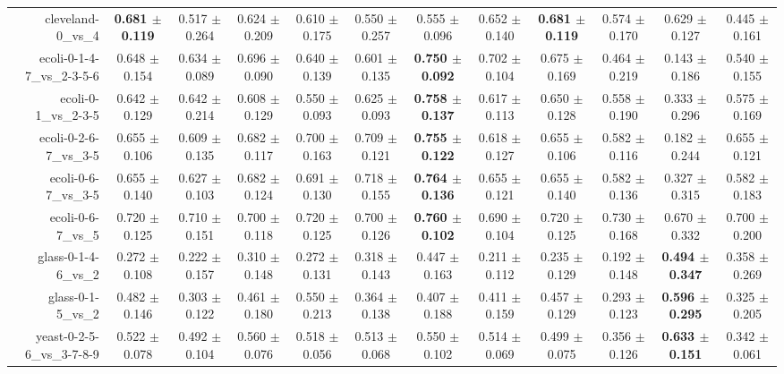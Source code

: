 \begin{table}[!ht]
{\begin{tabular}{r c c c c c c c c c c c}
cleveland-0\_vs\_4 & \textbf{0.681 $\pm$ 0.119} & 0.517 $\pm$ 0.264 & 0.624 $\pm$ 0.209 & 0.610 $\pm$ 0.175 & 0.550 $\pm$ 0.257 & 0.555 $\pm$ 0.096 & 0.652 $\pm$ 0.140 & \textbf{0.681 $\pm$ 0.119} & 0.574 $\pm$ 0.170 & 0.629 $\pm$ 0.127 & 0.445 $\pm$ 0.161 \\
ecoli-0-1-4-7\_vs\_2-3-5-6 & 0.648 $\pm$ 0.154 & 0.634 $\pm$ 0.089 & 0.696 $\pm$ 0.090 & 0.640 $\pm$ 0.139 & 0.601 $\pm$ 0.135 & \textbf{0.750 $\pm$ 0.092} & 0.702 $\pm$ 0.104 & 0.675 $\pm$ 0.169 & 0.464 $\pm$ 0.219 & 0.143 $\pm$ 0.186 & 0.540 $\pm$ 0.155 \\
ecoli-0-1\_vs\_2-3-5 & 0.642 $\pm$ 0.129 & 0.642 $\pm$ 0.214 & 0.608 $\pm$ 0.129 & 0.550 $\pm$ 0.093 & 0.625 $\pm$ 0.093 & \textbf{0.758 $\pm$ 0.137} & 0.617 $\pm$ 0.113 & 0.650 $\pm$ 0.128 & 0.558 $\pm$ 0.190 & 0.333 $\pm$ 0.296 & 0.575 $\pm$ 0.169 \\
ecoli-0-2-6-7\_vs\_3-5 & 0.655 $\pm$ 0.106 & 0.609 $\pm$ 0.135 & 0.682 $\pm$ 0.117 & 0.700 $\pm$ 0.163 & 0.709 $\pm$ 0.121 & \textbf{0.755 $\pm$ 0.122} & 0.618 $\pm$ 0.127 & 0.655 $\pm$ 0.106 & 0.582 $\pm$ 0.116 & 0.182 $\pm$ 0.244 & 0.655 $\pm$ 0.121 \\
ecoli-0-6-7\_vs\_3-5 & 0.655 $\pm$ 0.140 & 0.627 $\pm$ 0.103 & 0.682 $\pm$ 0.124 & 0.691 $\pm$ 0.130 & 0.718 $\pm$ 0.155 & \textbf{0.764 $\pm$ 0.136} & 0.655 $\pm$ 0.121 & 0.655 $\pm$ 0.140 & 0.582 $\pm$ 0.136 & 0.327 $\pm$ 0.315 & 0.582 $\pm$ 0.183 \\
ecoli-0-6-7\_vs\_5 & 0.720 $\pm$ 0.125 & 0.710 $\pm$ 0.151 & 0.700 $\pm$ 0.118 & 0.720 $\pm$ 0.125 & 0.700 $\pm$ 0.126 & \textbf{0.760 $\pm$ 0.102} & 0.690 $\pm$ 0.104 & 0.720 $\pm$ 0.125 & 0.730 $\pm$ 0.168 & 0.670 $\pm$ 0.332 & 0.700 $\pm$ 0.200 \\
glass-0-1-4-6\_vs\_2 & 0.272 $\pm$ 0.108 & 0.222 $\pm$ 0.157 & 0.310 $\pm$ 0.148 & 0.272 $\pm$ 0.131 & 0.318 $\pm$ 0.143 & 0.447 $\pm$ 0.163 & 0.211 $\pm$ 0.112 & 0.235 $\pm$ 0.129 & 0.192 $\pm$ 0.148 & \textbf{0.494 $\pm$ 0.347} & 0.358 $\pm$ 0.269 \\
glass-0-1-5\_vs\_2 & 0.482 $\pm$ 0.146 & 0.303 $\pm$ 0.122 & 0.461 $\pm$ 0.180 & 0.550 $\pm$ 0.213 & 0.364 $\pm$ 0.138 & 0.407 $\pm$ 0.188 & 0.411 $\pm$ 0.159 & 0.457 $\pm$ 0.129 & 0.293 $\pm$ 0.123 & \textbf{0.596 $\pm$ 0.295} & 0.325 $\pm$ 0.205 \\
yeast-0-2-5-6\_vs\_3-7-8-9 & 0.522 $\pm$ 0.078 & 0.492 $\pm$ 0.104 & 0.560 $\pm$ 0.076 & 0.518 $\pm$ 0.056 & 0.513 $\pm$ 0.068 & 0.550 $\pm$ 0.102 & 0.514 $\pm$ 0.069 & 0.499 $\pm$ 0.075 & 0.356 $\pm$ 0.126 & \textbf{0.633 $\pm$ 0.151} & 0.342 $\pm$ 0.061 \\

\end{tabular}}
\end{table}

